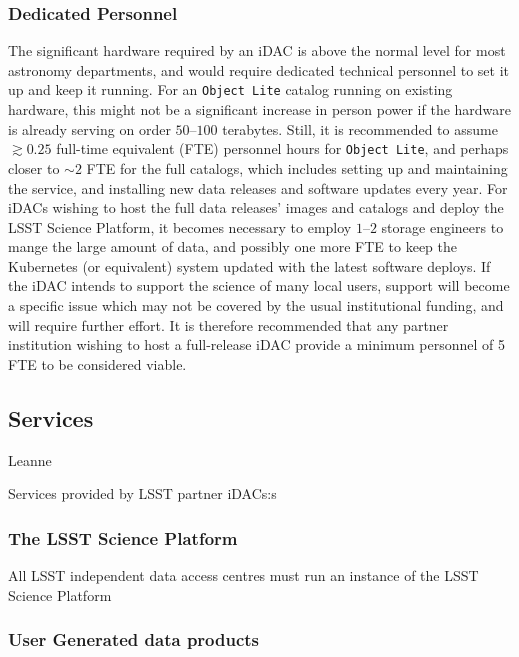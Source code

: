 \subsubsection{Dedicated Personnel}
The significant hardware required by an iDAC is above the normal level for most astronomy departments, and would require dedicated technical personnel to set it up and keep it running. For an {\tt Object Lite} catalog running on existing hardware, this might not be a significant increase in person power if the hardware is already serving on order $50$--$100$ terabytes. Still, it is recommended to assume $\gtrsim0.25$ full-time equivalent (FTE) personnel hours for {\tt Object Lite}, and perhaps closer to $\sim2$ FTE for the full catalogs, which includes setting up and maintaining the service, and installing new data releases and software updates every year. For iDACs wishing to host the full data releases' images and catalogs and deploy the LSST Science Platform, it becomes necessary to employ $1$--$2$ storage engineers to mange the large amount of data, and possibly one more FTE to keep the Kubernetes (or equivalent) system updated with the latest software deploys. If the iDAC intends to support the science of many local users, support will become a specific issue which may not be covered by the usual institutional funding, and will require further effort. It is therefore recommended that any partner institution wishing to host a full-release iDAC provide a minimum personnel of 5 FTE to be considered viable.

\subsection{Services}
{\color{red} Leanne } \newline

Services provided by LSST partner iDACs:s

\subsubsection{The LSST Science Platform}
All LSST independent data access centres must run an instance of the LSST Science Platform

\subsubsection{User Generated data products }

